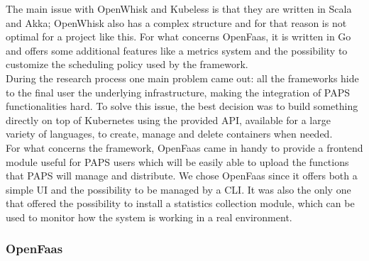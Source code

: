 \par
The main issue with OpenWhisk and Kubeless is 
that they are written in Scala and Akka; OpenWhisk also has a complex structure and for that reason 
is not optimal for a project like this. For what concerns OpenFaas, it is written
in Go and offers some additional features like a metrics system and the possibility to 
customize the scheduling policy used by the framework.
\\
During the research process one main  problem came out: all the frameworks hide to the final user 
the underlying infrastructure, making the integration of PAPS functionalities hard.
To solve this issue, the best decision was to build something directly on top of Kubernetes
using the provided API, available for a large variety of languages, to create, manage and 
delete containers when needed. \\
For what concerns the framework, OpenFaas came in handy to provide a frontend module 
useful for PAPS users which will be easily able to upload the functions that PAPS
will manage and distribute. We chose OpenFaas since it offers both a
simple UI and the possibility to be managed by a CLI. It was also the only one that offered the possibility to 
install a statistics collection module, which can be used to monitor how the
system is working in a real environment.


\subsubsection*{OpenFaas}

